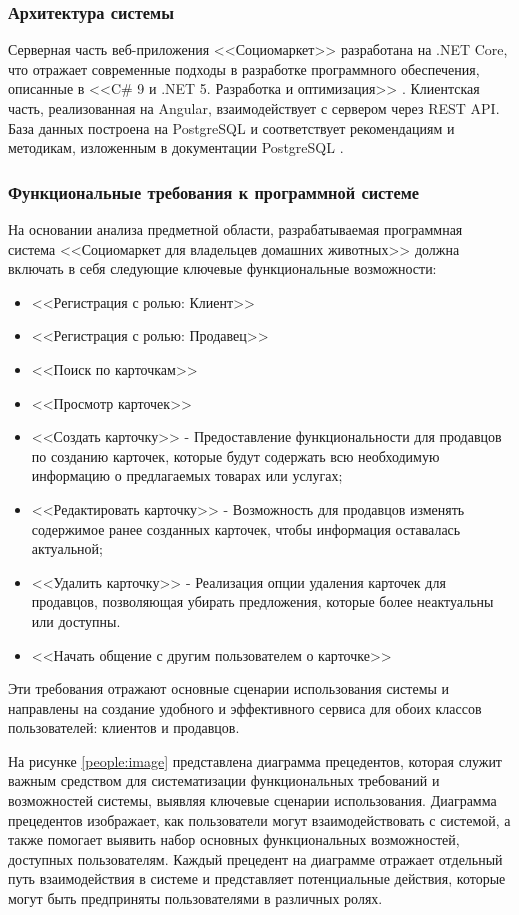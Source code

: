 \subsubsection{Архитектура системы} 
Серверная часть веб-приложения <<Социомаркет>> разработана на .NET Core, что отражает современные подходы в разработке программного обеспечения, описанные в <<C\# 9 и .NET 5. Разработка и оптимизация>> \cite{mark_price}. Клиентская часть, реализованная на Angular, взаимодействует с сервером через REST API. База данных построена на PostgreSQL и соответствует рекомендациям и методикам, изложенным в документации PostgreSQL \cite{postgresql}.

\subsubsection{Функциональные требования к программной системе}

На основании анализа предметной области, разрабатываемая программная система <<Социомаркет для владельцев домашних животных>> должна включать в себя следующие ключевые функциональные возможности:

\begin{itemize}
\item <<Регистрация с ролью: Клиент>>
\item <<Регистрация с ролью: Продавец>>
\item <<Поиск по карточкам>>
\item <<Просмотр карточек>>
\item <<Создать карточку>> -\- Предоставление функциональности для продавцов по созданию карточек, которые будут содержать всю необходимую информацию о предлагаемых товарах или услугах;
\item <<Редактировать карточку>> -\- Возможность для продавцов изменять содержимое ранее созданных карточек, чтобы информация оставалась актуальной;
\item <<Удалить карточку>> -\- Реализация опции удаления карточек для продавцов, позволяющая убирать предложения, которые более неактуальны или доступны.
\item <<Начать общение с другим пользователем о карточке>>
\end{itemize}

Эти требования отражают основные сценарии использования системы и направлены на создание удобного и эффективного сервиса для обоих классов пользователей: клиентов и продавцов.

На рисунке \ref{people:image} представлена диаграмма прецедентов, которая служит важным средством для систематизации функциональных требований и возможностей системы, выявляя ключевые сценарии использования. Диаграмма прецедентов изображает, как пользователи могут взаимодействовать с системой, а также помогает выявить набор основных функциональных возможностей, доступных пользователям. Каждый прецедент на диаграмме отражает отдельный путь взаимодействия в системе и представляет потенциальные действия, которые могут быть предприняты пользователями в различных ролях.

